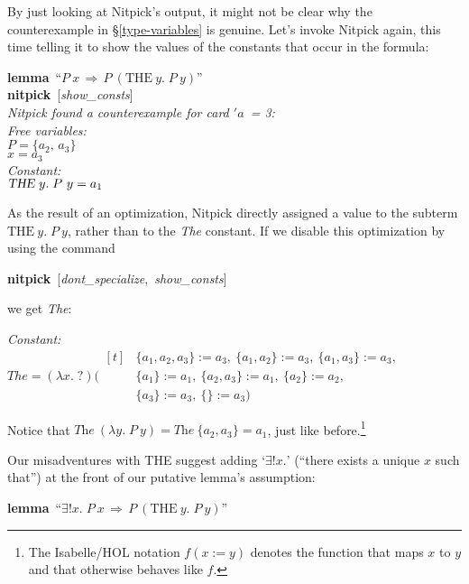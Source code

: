 \documentclass[a4paper,12pt]{article}
\def\unk{{?}}
\def\undef{(\lambda x.\; \unk)}
\begin{document}
By just looking at Nitpick's output, it might not be clear why the
counterexample in \S\ref{type-variables} is genuine. Let's invoke Nitpick again,
this time telling it to show the values of the constants that occur in the
formula:

\prew
\textbf{lemma}~``$P~x\,\Longrightarrow\, P~(\textrm{THE}~y.\;P~y)$'' \\
\textbf{nitpick}~[\textit{show\_consts}] \\[2\smallskipamount]
\slshape
Nitpick found a counterexample for \textit{card} $'a$~= 3: \\[2\smallskipamount]
\hbox{}\qquad Free variables: \nopagebreak \\
\hbox{}\qquad\qquad $P = \{a_2,\, a_3\}$ \\
\hbox{}\qquad\qquad $x = a_3$ \\
\hbox{}\qquad Constant: \nopagebreak \\
\hbox{}\qquad\qquad $\hbox{\slshape THE}~y.\;P~y = a_1$
\postw

As the result of an optimization, Nitpick directly assigned a value to the
subterm $\textrm{THE}~y.\;P~y$, rather than to the \textit{The} constant. If we
disable this optimization by using the command

\prew
\textbf{nitpick}~[\textit{dont\_specialize},\, \textit{show\_consts}]
\postw

we get \textit{The}:

\prew
\slshape Constant: \nopagebreak \\
\hbox{}\qquad $\mathit{The} = \undef{}
    (\!\begin{aligned}[t]%
    & \{a_1, a_2, a_3\} := a_3,\> \{a_1, a_2\} := a_3,\> \{a_1, a_3\} := a_3, \\[-2pt] %
    & \{a_1\} := a_1,\> \{a_2, a_3\} := a_1,\> \{a_2\} := a_2, \\[-2pt]
    & \{a_3\} := a_3,\> \{\} := a_3)\end{aligned}$
\postw

Notice that $\textit{The}~(\lambda y.\;P~y) = \textit{The}~\{a_2, a_3\} = a_1$,
just like before.\footnote{The Isabelle/HOL notation $f(x :=
y)$ denotes the function that maps $x$ to $y$ and that otherwise behaves like
$f$.}

Our misadventures with THE suggest adding `$\exists!x{.}$' (``there exists a
unique $x$ such that'') at the front of our putative lemma's assumption:

\prew
\textbf{lemma}~``$\exists {!}x.\; P~x\,\Longrightarrow\, P~(\textrm{THE}~y.\;P~y)$''
\postw
\end{document}
